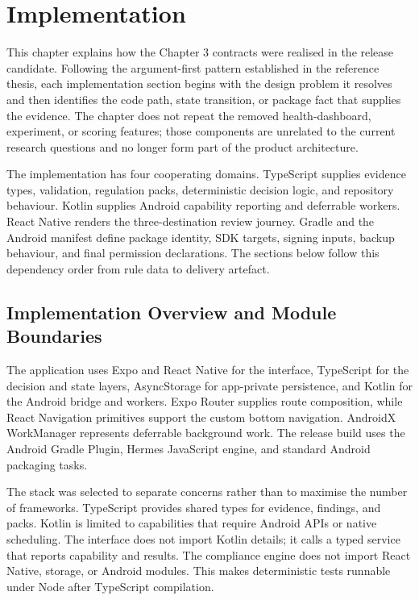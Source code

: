 \section{Implementation}

This chapter explains how the Chapter 3 contracts were realised in the release candidate. Following the argument-first pattern established in the reference thesis, each implementation section begins with the design problem it resolves and then identifies the code path, state transition, or package fact that supplies the evidence. The chapter does not repeat the removed health-dashboard, experiment, or scoring features; those components are unrelated to the current research questions and no longer form part of the product architecture.

The implementation has four cooperating domains. TypeScript supplies evidence types, validation, regulation packs, deterministic decision logic, and repository behaviour. Kotlin supplies Android capability reporting and deferrable workers. React Native renders the three-destination review journey. Gradle and the Android manifest define package identity, SDK targets, signing inputs, backup behaviour, and final permission declarations. The sections below follow this dependency order from rule data to delivery artefact.

\subsection{Implementation Overview and Module Boundaries}

The application uses Expo and React Native for the interface, TypeScript for the decision and state layers, AsyncStorage for app-private persistence, and Kotlin for the Android bridge and workers. Expo Router supplies route composition, while React Navigation primitives support the custom bottom navigation. AndroidX WorkManager represents deferrable background work. The release build uses the Android Gradle Plugin, Hermes JavaScript engine, and standard Android packaging tasks.

The stack was selected to separate concerns rather than to maximise the number of frameworks. TypeScript provides shared types for evidence, findings, and packs. Kotlin is limited to capabilities that require Android APIs or native scheduling. The interface does not import Kotlin details; it calls a typed service that reports capability and results. The compliance engine does not import React Native, storage, or Android modules. This makes deterministic tests runnable under Node after TypeScript compilation.

